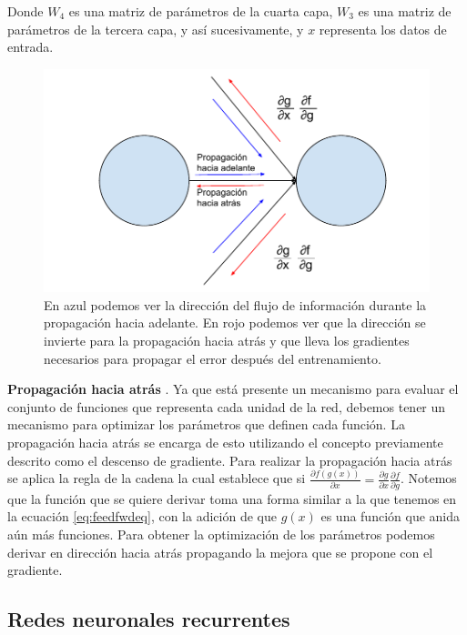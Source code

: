 Donde $W_4$ es una matriz de parámetros de la cuarta capa, $W_3$ es una matriz de parámetros de la tercera capa, y así sucesivamente, y $x$ representa los datos de entrada.

\begin{figure}
\includegraphics[scale=0.8]{Figures/backprop.pdf}
\caption{En azul podemos ver la dirección del flujo de información durante la propagación hacia adelante. En rojo podemos ver que la dirección se invierte para la propagación hacia atrás y que lleva los gradientes necesarios para propagar el error después del entrenamiento.}
\label{fig:backprop}
\end{figure}


\textbf{Propagación hacia atrás} \parencite{rumelhart1986learning}. Ya que está presente un mecanismo para evaluar el conjunto de funciones que representa cada unidad de la red, debemos tener un mecanismo para optimizar los parámetros que definen cada función. La propagación hacia atrás se encarga de esto utilizando el concepto previamente descrito como el descenso de gradiente. Para realizar la propagación hacia atrás se aplica la regla de la cadena la cual establece que si $\frac{\partial f(g(x))}{\partial x} = \frac{\partial g}{\partial x} \frac{\partial f}{\partial g}$. Notemos que la función que se quiere derivar toma una forma similar a la que tenemos en la ecuación \ref{eq:feedfwdeq}, con la adición de que $g(x)$ es una función que anida aún más funciones. Para obtener la optimización de los parámetros podemos derivar en dirección hacia atrás propagando la mejora que se propone con el gradiente.

\subsection{Redes neuronales recurrentes}

